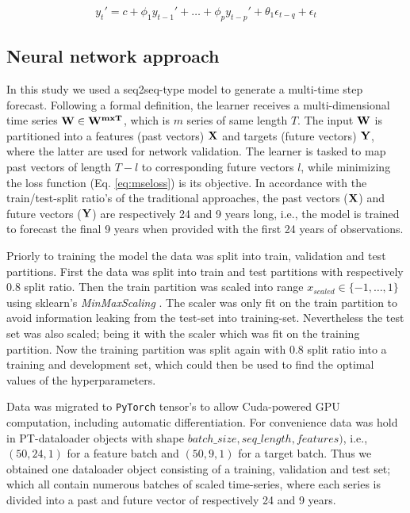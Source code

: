 \documentclass[format=sigconf, review=false, screen=true]{acmart}
\begin{document}
\begin{equation}
\label{eq:arima}
y_t' = c + \phi_1y_{t-1}' + \dots + \phi_py_{t-p}' + \theta_{1} \epsilon_{t-q} + \epsilon_t
\end{equation}


\subsection{Neural network approach}

In this study we used a seq2seq-type model to generate a multi-time step forecast. Following  a formal definition, the learner receives a multi-dimensional time series $\bf{W} \in W^{m x T}$, which is $m$ series of same length $T$. The input $\bf{W}$ is partitioned into a features (past vectors) $\bf{X}$ and targets (future vectors) $\bf{Y}$, where the latter are used for network validation. The learner is tasked to map past vectors of length $T-l$ to corresponding future vectors $l$, while minimizing the loss function (Eq. \ref{eq:mseloss}) is its objective. In accordance with the train/test-split ratio's of the traditional approaches, the past vectors ($\bf{X}$) and future vectors ($\bf{Y}$) are respectively 24 and 9 years long, i.e., the model is trained to forecast the final 9 years when provided with the first 24 years of observations. 

Priorly to training the model the data was split into train, validation and test partitions. First the data was split into train and test partitions with respectively 0.8 split ratio. Then the train partition was scaled into range $x_{scaled} \in \{-1,\dots, 1\}$ using sklearn's \textit{MinMaxScaling} \citep{scikit-learn}. The scaler was only fit on the train partition to avoid information leaking from the test-set into training-set. Nevertheless the test set was also scaled; being it with the scaler which was fit on the training partition. Now the training partition was split again with 0.8 split ratio into a training and development set, which could then be used to find the optimal values of the hyperparameters. 

Data was migrated to \texttt{PyTorch} \citep{paszke2017automatic} tensor's to allow Cuda-powered GPU computation, including automatic differentiation. For convenience data was hold in PT-dataloader objects with shape $batch\_size, seq\_length, features)$, i.e., $(50, 24, 1)$ for a feature batch and $(50, 9, 1)$ for a target batch. Thus we obtained one dataloader object consisting of a training, validation and test set; which all contain numerous batches of scaled time-series, where each series is divided into a past and future vector of respectively 24 and 9 years.   
\end{document}
